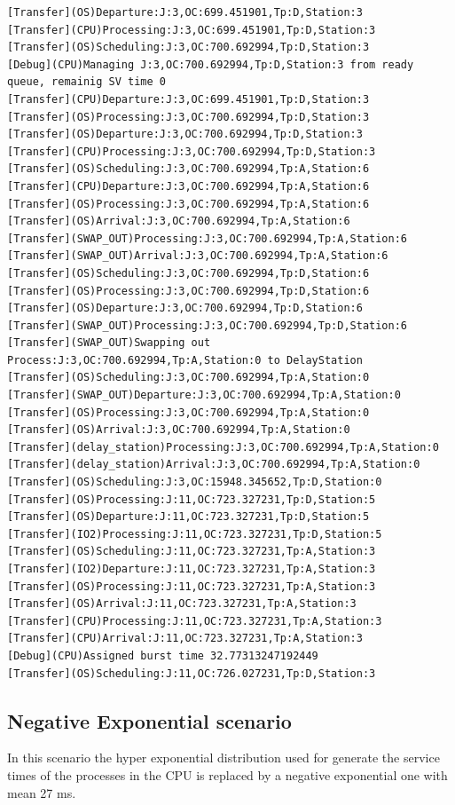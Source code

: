 \documentclass[12pt,a4paper]{article}
\begin{document}
\begin{lstlisting}
[Transfer](OS)Departure:J:3,OC:699.451901,Tp:D,Station:3
[Transfer](CPU)Processing:J:3,OC:699.451901,Tp:D,Station:3
[Transfer](OS)Scheduling:J:3,OC:700.692994,Tp:D,Station:3
[Debug](CPU)Managing J:3,OC:700.692994,Tp:D,Station:3 from ready queue, remainig SV time 0
[Transfer](CPU)Departure:J:3,OC:699.451901,Tp:D,Station:3
[Transfer](OS)Processing:J:3,OC:700.692994,Tp:D,Station:3
[Transfer](OS)Departure:J:3,OC:700.692994,Tp:D,Station:3
[Transfer](CPU)Processing:J:3,OC:700.692994,Tp:D,Station:3
[Transfer](OS)Scheduling:J:3,OC:700.692994,Tp:A,Station:6
[Transfer](CPU)Departure:J:3,OC:700.692994,Tp:A,Station:6
[Transfer](OS)Processing:J:3,OC:700.692994,Tp:A,Station:6
[Transfer](OS)Arrival:J:3,OC:700.692994,Tp:A,Station:6
[Transfer](SWAP_OUT)Processing:J:3,OC:700.692994,Tp:A,Station:6
[Transfer](SWAP_OUT)Arrival:J:3,OC:700.692994,Tp:A,Station:6
[Transfer](OS)Scheduling:J:3,OC:700.692994,Tp:D,Station:6
[Transfer](OS)Processing:J:3,OC:700.692994,Tp:D,Station:6
[Transfer](OS)Departure:J:3,OC:700.692994,Tp:D,Station:6
[Transfer](SWAP_OUT)Processing:J:3,OC:700.692994,Tp:D,Station:6
[Transfer](SWAP_OUT)Swapping out Process:J:3,OC:700.692994,Tp:A,Station:0 to DelayStation
[Transfer](OS)Scheduling:J:3,OC:700.692994,Tp:A,Station:0
[Transfer](SWAP_OUT)Departure:J:3,OC:700.692994,Tp:A,Station:0
[Transfer](OS)Processing:J:3,OC:700.692994,Tp:A,Station:0
[Transfer](OS)Arrival:J:3,OC:700.692994,Tp:A,Station:0
[Transfer](delay_station)Processing:J:3,OC:700.692994,Tp:A,Station:0
[Transfer](delay_station)Arrival:J:3,OC:700.692994,Tp:A,Station:0
[Transfer](OS)Scheduling:J:3,OC:15948.345652,Tp:D,Station:0
[Transfer](OS)Processing:J:11,OC:723.327231,Tp:D,Station:5
[Transfer](OS)Departure:J:11,OC:723.327231,Tp:D,Station:5
[Transfer](IO2)Processing:J:11,OC:723.327231,Tp:D,Station:5
[Transfer](OS)Scheduling:J:11,OC:723.327231,Tp:A,Station:3
[Transfer](IO2)Departure:J:11,OC:723.327231,Tp:A,Station:3
[Transfer](OS)Processing:J:11,OC:723.327231,Tp:A,Station:3
[Transfer](OS)Arrival:J:11,OC:723.327231,Tp:A,Station:3
[Transfer](CPU)Processing:J:11,OC:723.327231,Tp:A,Station:3
[Transfer](CPU)Arrival:J:11,OC:723.327231,Tp:A,Station:3
[Debug](CPU)Assigned burst time 32.77313247192449
[Transfer](OS)Scheduling:J:11,OC:726.027231,Tp:D,Station:3
\end{lstlisting}

\subsection{Negative Exponential scenario}

In this scenario the hyper exponential distribution used for generate the service times of the processes in the CPU is replaced by a negative exponential one with mean 27 ms. 
\end{document}
